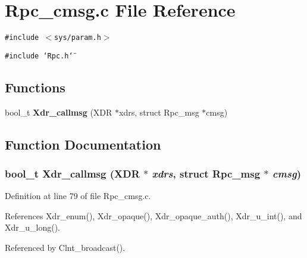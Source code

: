 \section{Rpc\_\-cmsg.c File Reference}
\label{Rpc__cmsg_8c}
{\tt \#include $<$sys/param.h$>$}\par
{\tt \#include \char`\"{}Rpc.h\char`\"{}}\par
\subsection*{Functions}
\begin{CompactItemize}
\item 
bool\_\-t {\bf Xdr\_\-callmsg} (XDR $\ast$xdrs, struct Rpc\_\-msg $\ast$cmsg)
\end{CompactItemize}


\subsection{Function Documentation}
\subsubsection{\setlength{\rightskip}{0pt plus 5cm}bool\_\-t Xdr\_\-callmsg (XDR $\ast$ {\em xdrs}, struct Rpc\_\-msg $\ast$ {\em cmsg})}\label{Rpc__cmsg_8c_a0}




Definition at line 79 of file Rpc\_\-cmsg.c.

References Xdr\_\-enum(), Xdr\_\-opaque(), Xdr\_\-opaque\_\-auth(), Xdr\_\-u\_\-int(), and Xdr\_\-u\_\-long().

Referenced by Clnt\_\-broadcast().